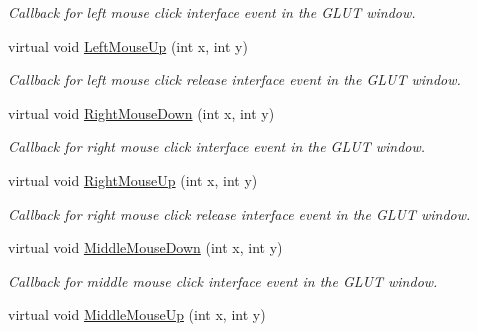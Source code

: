 \begin{DoxyCompactItemize}
\begin{DoxyCompactList}\small\item\em Callback for left mouse click interface event in the G\+L\+UT window. \end{DoxyCompactList}\item 
virtual void \hyperlink{classimage__tools_1_1BaseGfxApp_a38e8246acf13e59f7d563e1bb479fdba}{Left\+Mouse\+Up} (int x, int y)\hypertarget{classimage__tools_1_1BaseGfxApp_a38e8246acf13e59f7d563e1bb479fdba}{}\label{classimage__tools_1_1BaseGfxApp_a38e8246acf13e59f7d563e1bb479fdba}

\begin{DoxyCompactList}\small\item\em Callback for left mouse click release interface event in the G\+L\+UT window. \end{DoxyCompactList}\item 
virtual void \hyperlink{classimage__tools_1_1BaseGfxApp_a62302f1b34b93f21b8bcdfe6bbfed6c7}{Right\+Mouse\+Down} (int x, int y)\hypertarget{classimage__tools_1_1BaseGfxApp_a62302f1b34b93f21b8bcdfe6bbfed6c7}{}\label{classimage__tools_1_1BaseGfxApp_a62302f1b34b93f21b8bcdfe6bbfed6c7}

\begin{DoxyCompactList}\small\item\em Callback for right mouse click interface event in the G\+L\+UT window. \end{DoxyCompactList}\item 
virtual void \hyperlink{classimage__tools_1_1BaseGfxApp_a96716278afda904913202685a0d7e146}{Right\+Mouse\+Up} (int x, int y)\hypertarget{classimage__tools_1_1BaseGfxApp_a96716278afda904913202685a0d7e146}{}\label{classimage__tools_1_1BaseGfxApp_a96716278afda904913202685a0d7e146}

\begin{DoxyCompactList}\small\item\em Callback for right mouse click release interface event in the G\+L\+UT window. \end{DoxyCompactList}\item 
virtual void \hyperlink{classimage__tools_1_1BaseGfxApp_adc07f734785ac1863d69e484b3b14e9c}{Middle\+Mouse\+Down} (int x, int y)\hypertarget{classimage__tools_1_1BaseGfxApp_adc07f734785ac1863d69e484b3b14e9c}{}\label{classimage__tools_1_1BaseGfxApp_adc07f734785ac1863d69e484b3b14e9c}

\begin{DoxyCompactList}\small\item\em Callback for middle mouse click interface event in the G\+L\+UT window. \end{DoxyCompactList}\item 
virtual void \hyperlink{classimage__tools_1_1BaseGfxApp_aacd2e87274e8731f34eaf2e0816001e8}{Middle\+Mouse\+Up} (int x, int y)\hypertarget{classimage__tools_1_1BaseGfxApp_aacd2e87274e8731f34eaf2e0816001e8}{}\label{classimage__tools_1_1BaseGfxApp_aacd2e87274e8731f34eaf2e0816001e8}


\end{DoxyCompactItemize}
